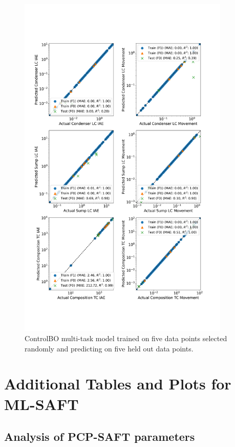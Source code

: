 \begin{figure}
    \centering
    \includegraphics[width=0.9\textwidth]{gfx/Appendix/parity_plot_multitask.png}
    \caption{ControlBO multi-task model trained on five data points selected randomly and  predicting on five held out data points.}
    \label{fig:mt_parity_plot_controlbo}
\end{figure}


\chapter{Additional Tables and Plots for ML-SAFT}

\section{Analysis of PCP-SAFT parameters}\label{app:sensitivity}

